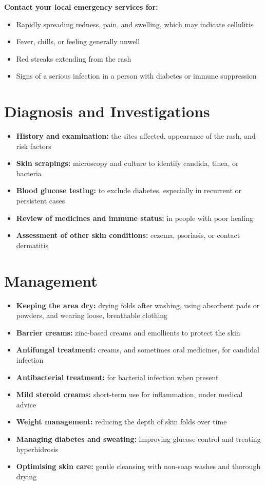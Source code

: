 \textbf{Contact your local emergency services for:}
\begin{itemize}
    \item Rapidly spreading redness, pain, and swelling, which may indicate cellulitis
    \item Fever, chills, or feeling generally unwell
    \item Red streaks extending from the rash
    \item Signs of a serious infection in a person with diabetes or immune suppression
\end{itemize}

\section*{Diagnosis and Investigations}
\begin{itemize}
    \item \textbf{History and examination:} the sites affected, appearance of the rash, and risk factors
    \item \textbf{Skin scrapings:} microscopy and culture to identify candida, tinea, or bacteria
    \item \textbf{Blood glucose testing:} to exclude diabetes, especially in recurrent or persistent cases
    \item \textbf{Review of medicines and immune status:} in people with poor healing
    \item \textbf{Assessment of other skin conditions:} eczema, psoriasis, or contact dermatitis
\end{itemize}

\section*{Management}
\begin{itemize}
    \item \textbf{Keeping the area dry:} drying folds after washing, using absorbent pads or powders, and wearing loose, breathable clothing
    \item \textbf{Barrier creams:} zinc-based creams and emollients to protect the skin
    \item \textbf{Antifungal treatment:} creams, and sometimes oral medicines, for candidal infection
    \item \textbf{Antibacterial treatment:} for bacterial infection when present
    \item \textbf{Mild steroid creams:} short-term use for inflammation, under medical advice
    \item \textbf{Weight management:} reducing the depth of skin folds over time
    \item \textbf{Managing diabetes and sweating:} improving glucose control and treating hyperhidrosis
    \item \textbf{Optimising skin care:} gentle cleansing with non-soap washes and thorough drying
\end{itemize}

